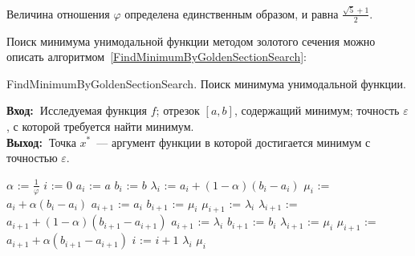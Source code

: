 \documentclass[10pt,a4paper,titlepage]{article}
\newcommand{\INPUT}{\textbf{Вход:~}}
\newcommand{\OUTPUT}{\textbf{Выход:~}}
\begin{document}
Величина отношения $\varphi$ определена единственным образом, и равна $\frac{\sqrt{5} + 1}{2}.$

Поиск минимума унимодальной функции методом золотого сечения можно описать алгоритмом~\ref{FindMinimumByGoldenSectionSearch}:
\begin{algorithm}[H]
\caption{FindMinimumByGoldenSectionSearch. Поиск минимума унимодальной функции.}
\label{FindMinimumByGoldenSectionSearch}
\INPUT Исследуемая функция $f$; отрезок $[a,b]$, содержащий минимум; точность $\varepsilon$, с которой требуется найти минимум. \\
\OUTPUT Точка $x^*$~--- аргумент функции в которой достигается минимум с точностью $\varepsilon$.

\begin{algorithmic}
\STATE {}
\STATE $\alpha$ := $\frac{1}{\varphi}$ 
\STATE $i$ := 0 
\STATE {}
\STATE $a_i$ := $a$
\STATE $b_i$ := $b$
\STATE {}
\STATE $\lambda_i$ := $a_i + (1 - \alpha)(b_i - a_i)$
\STATE $\mu_i$ := $a_i + \alpha(b_i - a_i)$
\STATE {}
    \STATE {}
    \STATE $a_{i+1}$ := $a_i$
    \STATE $b_{i+1}$ := $\mu_i$
    \STATE {}
    \STATE $\mu_{i+1}$ := $\lambda_i$
    \STATE $\lambda_{i+1}$ := $a_{i+1} + (1 - \alpha)(b_{i+1} - a_{i+1})$
  \ELSE
    \STATE {}
    \STATE $a_{i+1}$ := $\lambda_i$
    \STATE $b_{i+1}$ := $b_i$
    \STATE $\lambda_{i+1}$ := $\mu_i$
    \STATE $\mu_{i+1}$ := $a_{i+1} + \alpha(b_{i+1} - a_{i+1})$
  \ENDIF
  \STATE $i$ := $i + 1$
\ENDWHILE
\STATE {}
  \RETURN $\lambda_i$
\ELSE
  \RETURN $\mu_i$
\ENDIF
\end{algorithmic}
\end{algorithm}
\end{document}
